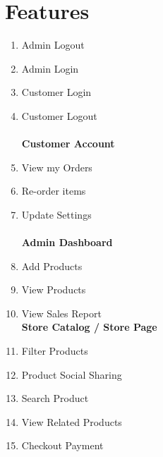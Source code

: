 \documentclass{report}
\begin{document}
\section{Features}
\begin{enumerate}
\item Admin Logout
\item Admin Login
\item Customer Login
\item Customer Logout \\ \\
\textbf{Customer Account}
\item View my Orders
\item Re-order items
\item Update Settings \\ \\
\textbf{Admin Dashboard}
\item Add Products
\item View Products
\item View Sales Report \\
\textbf{Store Catalog / Store Page}
\item Filter Products
\item Product Social Sharing
\item Search Product
\item View Related Products
\item Checkout Payment
\end{enumerate}
\end{document}
